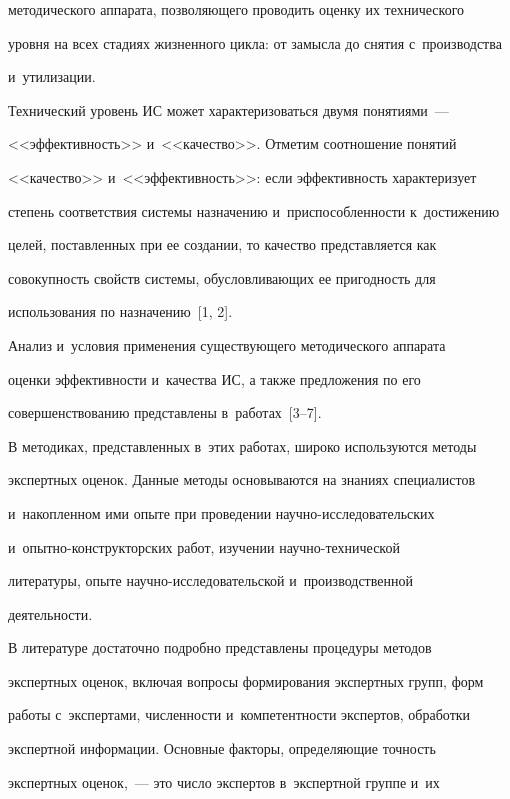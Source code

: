 методического аппарата, позволяющего проводить оценку их технического 

уровня на всех стадиях жизненного цикла: от замысла до снятия с~производства 

и~утилизации.

  

  Технический уровень ИС может характеризоваться двумя понятиями~--- 

<<эффективность>> и~<<качество>>. Отметим соотношение понятий 

<<качество>> и~<<эффективность>>: если эффективность характеризует 

степень соответствия системы назначению и~приспособленности к~достижению 

целей, поставленных при ее создании, то качество представляется как 

совокупность свойств системы, обусловливающих ее пригодность для 

использования по назначению~[1, 2].

  

  Анализ и~условия применения существующего методического аппарата 

оценки эффективности и~качества ИС, а также предложения по его 

совершенствованию представлены в~работах~[3--7].


  В методиках, представленных в~этих работах, широко используются методы 

экспертных оценок. Данные методы основываются на знаниях специалистов 

и~накопленном ими опыте при проведении на\-уч\-но-ис\-сле\-до\-ва\-тель\-ских 

и~опыт\-но-кон\-ст\-рук\-тор\-ских работ, изучении на\-уч\-но-тех\-ни\-че\-ской 

литературы, опыте на\-уч\-но-ис\-сле\-до\-ва\-тель\-ской и~производственной 

деятельности.

  

  В литературе достаточно подробно представлены процедуры методов 

экспертных оценок, включая вопросы формирования экспертных групп, форм 

работы с~экспертами, численности и~компетентности экспертов, обработки 

экспертной информации. Основные факторы, определяющие точность 

экспертных оценок,~--- это число экспертов в~экспертной группе и~их 

